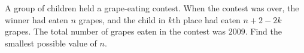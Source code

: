 A group of children held a grape-eating contest. When the contest was over, the winner had eaten $ n$ grapes, and the child in $ k$th place had eaten $ n+2-2k$ grapes. The total number of grapes eaten in the contest was $ 2009$. Find the smallest possible value of $ n$.